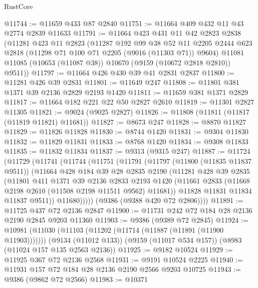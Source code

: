 \begin{lexlean}{RustCore}
\begin{coremodule}
@11744 := @11659 @433 @87 @2840
@11751 := @11664 @409 @432 @11 @43 @2774 @2839 @11633
@11791 := @11664
    @423
    @431
    @11
    @42
    @2823
    @2838
    (@11281
      @423
      @11
      @2823
      (@11287
        @192
        @99
        @38
        @52
        @11
        @2205
        @2444
        @623
        @2818
        (@11298 @71 @100 @71 @2205 (@9016 (@11303 @71)) @9604)
        @11081
        @11085
        (@10653 (@11087 @38))
        @10670
        (@9159 (@10672 @2818 @2810))
        @9511))
@11797 := @11664 @426 @430 @39 @41 @2831 @2837
@11800 := @11281 @426 @39 @2831
@11801 := @11649 @247
@11808 := @11801 @381 @1371 @39 @2136 @2829 @2193 @1420
@11811 := @11659 @381 @1371 @2829
@11817 := @11664 @182 @221 @22 @50 @2827 @2610
@11819 := @11301 @2827 @11305
@11821 := @9024 (@9025 @2827)
@11826 := @11808 (@11811 (@11817 (@11819 @11821) @11681))
@11827 := @8673 @247
@11828 := @8870 @11827
@11829 := @11826 @11828
@11830 := @8744 @1420
@11831 := @9304 @11830
@11832 := @11829 @11831
@11833 := @8768 @1420
@11834 := @9308 @11833
@11835 := @11832 @11834
@11837 := @9313 (@9315 @247)
@11887 := @11724
    (@11729
      (@11741
        (@11744
          (@11751
            (@11791
              (@11797
                (@11800 (@11835 @11837 @9511))
                (@11664
                  @428
                  @184
                  @39
                  @28
                  @2835
                  @2190
                  (@11281
                    @428
                    @39
                    @2835
                    (@11801
                      @411
                      @1371
                      @39
                      @2136
                      @2833
                      @2193
                      @1420
                      (@11661 @2833 (@11668 @2198 @2610 (@11508 @2198 @11511 @9562) @11681))
                      @11828
                      @11831
                      @11834
                      @11837
                      @9511))
                  @11680)))))
        (@9386 (@9388 @420 @72 @2806))))
@11891 := @11725 @437 @72 @2136 @2847
@11900 := @11731 @242 @72 @184 @28 @2136 @2190 @2845 @9203 @11360
@11903 := @9386 (@9389 @72 @2845)
@11924 := @10981
    (@11030 (@11103 (@11202 (@11714 (@11887 (@11891 (@11900 @11903)))))))
    (@9134 (@11012 @133))
    (@9159 (@11017 @534 @157))
    (@8983 (@11024 @157 @135 @2563 @2136))
@11925 := @9182 @10524
@11929 := @11925 @367 @72 @2136 @2568
@11931 := @9191 @10524 @2225
@11940 := @11931 @157 @72 @184 @28 @2136 @2190 @2566 @9203 @10725
@11943 := @9386 (@9862 @72 @2566)
@11983 := @10371

\end{coremodule}
\end{lexlean}
